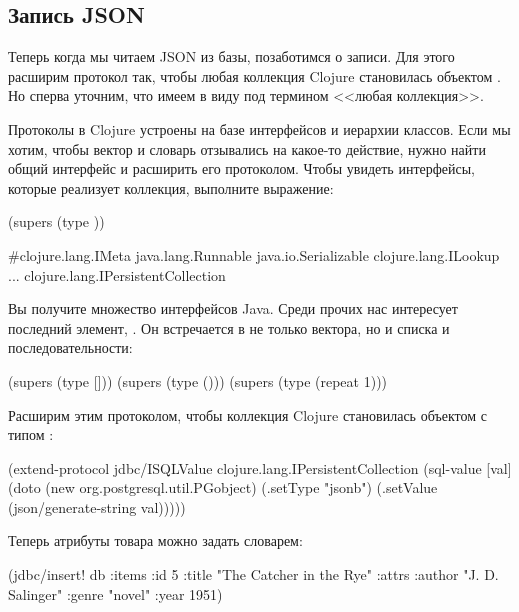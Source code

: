\subsection{Запись JSON}

Теперь когда мы читаем JSON из базы, позаботимся о записи. Для этого расширим протокол  так, чтобы любая коллекция Clojure становилась объектом . Но сперва уточним, что имеем в виду под термином <<любая коллекция>>.

Протоколы в Clojure устроены на базе интерфейсов и иерархии классов. Если мы хотим, чтобы вектор и словарь отзывались на какое-то действие, нужно найти общий интерфейс и расширить его протоколом. Чтобы увидеть интерфейсы, которые реализует коллекция, выполните выражение:

\begin{english}
  \begin{clojure}
(supers (type {}))

#{clojure.lang.IMeta
  java.lang.Runnable
  java.io.Serializable
  clojure.lang.ILookup
  ...
  clojure.lang.IPersistentCollection}
  \end{clojure}
\end{english}

Вы получите множество интерфейсов Java. Среди прочих нас интересует последний элемент, . Он встречается в  не только вектора, но и списка и последовательности:

\begin{english}
  \begin{clojure}
(supers (type []))
(supers (type ()))
(supers (type (repeat 1)))
  \end{clojure}
\end{english}

Расширим  этим протоколом, чтобы коллекция Clojure становилась объектом  с типом :

\begin{english}
  \begin{clojure}
(extend-protocol jdbc/ISQLValue
  clojure.lang.IPersistentCollection
  (sql-value [val]
    (doto (new org.postgresql.util.PGobject)
      (.setType "jsonb")
      (.setValue (json/generate-string val)))))
  \end{clojure}
\end{english}

Теперь атрибуты товара можно задать словарем:

\begin{english}
  \begin{clojure}
(jdbc/insert! db :items
              {:id 5
               :title "The Catcher in the Rye"
               :attrs {:author "J. D. Salinger"
                       :genre "novel"
                       :year 1951}})
  \end{clojure}
\end{english}


